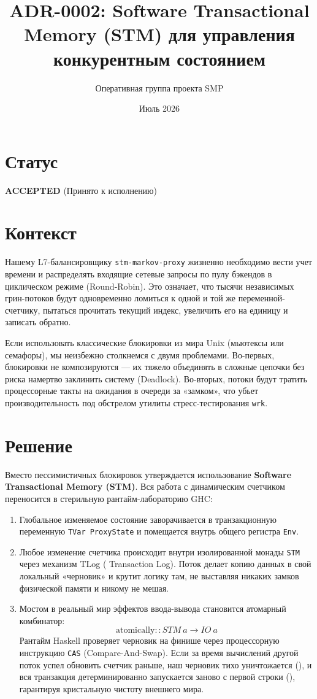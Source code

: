\documentclass{article}
\title{ADR-0002: Software Transactional Memory (STM) для управления конкурентным состоянием}
\author{Оперативная группа проекта SMP}
\date{Июль 2026}
\begin{document}
\maketitle

\section*{Статус}
\textbf{ACCEPTED} (Принято к исполнению)

\section*{Контекст}
Нашему L7-балансировщику \texttt{stm-markov-proxy} жизненно необходимо вести учет времени и распределять входящие сетевые запросы по пулу бэкендов в циклическом режиме (Round-Robin). Это означает, что тысячи независимых грин-потоков будут одновременно ломиться к одной и той же переменной-счетчику, пытаться прочитать текущий индекс, увеличить его на единицу и записать обратно.

Если использовать классические блокировки из мира Unix (мьютексы или семафоры), мы неизбежно столкнемся с двумя проблемами. Во-первых, блокировки не композируются — их тяжело объединять в сложные цепочки без риска намертво заклинить систему (Deadlock). Во-вторых, потоки будут тратить процессорные такты на ожидания в очереди за «замком», что убьет производительность под обстрелом утилиты стресс-тестирования \texttt{wrk}.

\section*{Решение}
Вместо пессимистичных блокировок утверждается использование \textbf{Software Transactional Memory (STM)}. Вся работа с динамическим счетчиком переносится в стерильную рантайм-лабораторию GHC:
\begin{enumerate}
    \item Глобальное изменяемое состояние заворачивается в транзакционную переменную \texttt{TVar ProxyState} и помещается внутрь общего регистра \texttt{Env}.
    \item Любое изменение счетчика происходит внутри изолированной монады \texttt{STM} через механизм TLog ( Transaction Log). Поток делает копию данных в свой локальный «черновик» и крутит логику там, не выставляя никаких замков физической памяти и никому не мешая.
    \item Мостом в реальный мир эффектов ввода-вывода становится атомарный комбинатор:
    \[ \text{atomically} :: STM\ a \to IO\ a \]
    Рантайм Haskell проверяет черновик на финише через процессорную инструкцию \texttt{CAS} (Compare-And-Swap). Если за время вычислений другой поток успел обновить счетчик раньше, наш черновик тихо уничтожается (), и вся транзакция детерминированно запускается заново с первой строки (), гарантируя кристальную чистоту внешнего мира.
\end{enumerate}
\end{document}
